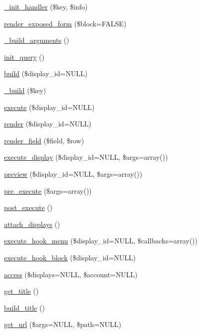 \begin{CompactItemize}
\hyperlink{classview_c63256fe2666c60445bc14aaf7a6e885}{\_\-init\_\-handler} (\$key, \$info)
\item 
\hyperlink{classview_a0cc06d017c4dfc8ea5119f076454e31}{render\_\-exposed\_\-form} (\$block=FALSE)
\item 
\hyperlink{classview_aca007d4c1a81235098314c3b54e9277}{\_\-build\_\-arguments} ()
\item 
\hyperlink{classview_f71eca2ca74a696efe9be2b7cd6fee8f}{init\_\-query} ()
\item 
\hyperlink{classview_e6c1bacf2c29c0b2b0f641c4768f2f44}{build} (\$display\_\-id=NULL)
\item 
\hyperlink{classview_85b835ebd83d4e84bf4fbda3829ce12b}{\_\-build} (\$key)
\item 
\hyperlink{classview_d33e492cac26ffd816fc9ba9361875d1}{execute} (\$display\_\-id=NULL)
\item 
\hyperlink{classview_b5ab302afd30f1c6805dc82883a5fdd4}{render} (\$display\_\-id=NULL)
\item 
\hyperlink{classview_6b91f886cd5ab16151c7ea2e0ba95ad2}{render\_\-field} (\$field, \$row)
\item 
\hyperlink{classview_6b47b3882f4fea8e53a11c88f147973b}{execute\_\-display} (\$display\_\-id=NULL, \$args=array())
\item 
\hyperlink{classview_e279461b2f1636e802587901acdf3bd2}{preview} (\$display\_\-id=NULL, \$args=array())
\item 
\hyperlink{classview_b3b5984d0d4628552580a2703502f840}{pre\_\-execute} (\$args=array())
\item 
\hyperlink{classview_c541f5588453cd52ce0b5c0e0b3443f4}{post\_\-execute} ()
\item 
\hyperlink{classview_39447f6a3f0456b0a2e75799c074e453}{attach\_\-displays} ()
\item 
\hyperlink{classview_89b35327558b4f24a6d153c683d02844}{execute\_\-hook\_\-menu} (\$display\_\-id=NULL, \$callbacks=array())
\item 
\hyperlink{classview_b9c161092929bfc45d9be9e0722a37ac}{execute\_\-hook\_\-block} (\$display\_\-id=NULL)
\item 
\hyperlink{classview_996e7b183eb9d43ec9d535dbf897616a}{access} (\$displays=NULL, \$account=NULL)
\item 
\hyperlink{classview_d2fe858c2ebd577922413355cd42eb10}{get\_\-title} ()
\item 
\hyperlink{classview_15a2dddb480ab44af4a093579a544501}{build\_\-title} ()
\item 
\hyperlink{classview_3ed974c9fffd899f1ad371c47e8781e3}{get\_\-url} (\$args=NULL, \$path=NULL)

\end{CompactItemize}
